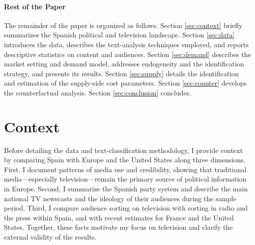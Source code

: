 \documentclass[12pt]{article}
\begin{document}

\paragraph{Rest of the Paper}

The remainder of the paper is organized as follows. Section \ref{sec:context} briefly summarizes the Spanish political and television landscape. Section \ref{sec:data} introduces the data, describes the text-analysis techniques employed, and reports descriptive statistics on content and audiences. Section \ref{sec:demand} describes the market setting and demand model, addresses endogeneity and the identification strategy, and presents its results. Section \ref{sec:supply} details the identification and estimation of the supply-side cost parameters. Section \ref{sec:counter} develops the counterfactual analysis. Section \ref{sec:conclusion} concludes.

	
	
	\section{Context}
	
Before detailing the data and text-classification methodology, I provide context by comparing Spain with Europe and the United States along three dimensions. First, I document patterns of media use and credibility, showing that traditional media—especially television—remain the primary source of political information in Europe. Second, I summarize the Spanish party system and describe the main national TV newscasts and the ideology of their audiences during the sample period. Third, I compare audience sorting on television with sorting in radio and the press within Spain, and with recent estimates for France and the United States. Together, these facts motivate my focus on television and clarify the external validity of the results.
	
\end{document}

